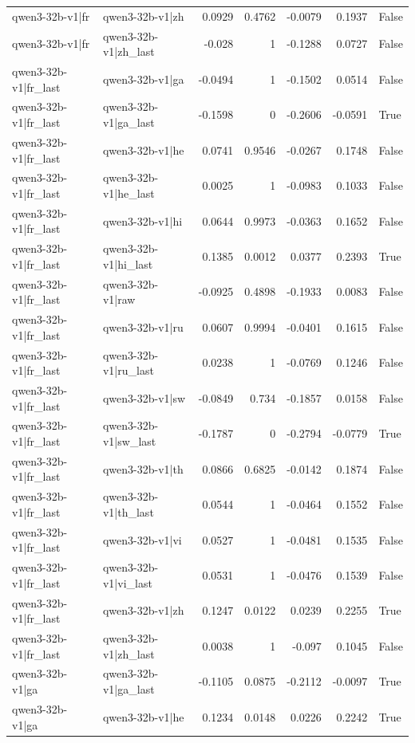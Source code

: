 \begin{table}
\begin{tabular}{l l r r r r l}
qwen3-32b-v1|fr & qwen3-32b-v1|zh & 0.0929 & 0.4762 & -0.0079 & 0.1937 & False \\
qwen3-32b-v1|fr & qwen3-32b-v1|zh_last & -0.028 & 1 & -0.1288 & 0.0727 & False \\
qwen3-32b-v1|fr_last & qwen3-32b-v1|ga & -0.0494 & 1 & -0.1502 & 0.0514 & False \\
qwen3-32b-v1|fr_last & qwen3-32b-v1|ga_last & -0.1598 & 0 & -0.2606 & -0.0591 & True \\
qwen3-32b-v1|fr_last & qwen3-32b-v1|he & 0.0741 & 0.9546 & -0.0267 & 0.1748 & False \\
qwen3-32b-v1|fr_last & qwen3-32b-v1|he_last & 0.0025 & 1 & -0.0983 & 0.1033 & False \\
qwen3-32b-v1|fr_last & qwen3-32b-v1|hi & 0.0644 & 0.9973 & -0.0363 & 0.1652 & False \\
qwen3-32b-v1|fr_last & qwen3-32b-v1|hi_last & 0.1385 & 0.0012 & 0.0377 & 0.2393 & True \\
qwen3-32b-v1|fr_last & qwen3-32b-v1|raw & -0.0925 & 0.4898 & -0.1933 & 0.0083 & False \\
qwen3-32b-v1|fr_last & qwen3-32b-v1|ru & 0.0607 & 0.9994 & -0.0401 & 0.1615 & False \\
qwen3-32b-v1|fr_last & qwen3-32b-v1|ru_last & 0.0238 & 1 & -0.0769 & 0.1246 & False \\
qwen3-32b-v1|fr_last & qwen3-32b-v1|sw & -0.0849 & 0.734 & -0.1857 & 0.0158 & False \\
qwen3-32b-v1|fr_last & qwen3-32b-v1|sw_last & -0.1787 & 0 & -0.2794 & -0.0779 & True \\
qwen3-32b-v1|fr_last & qwen3-32b-v1|th & 0.0866 & 0.6825 & -0.0142 & 0.1874 & False \\
qwen3-32b-v1|fr_last & qwen3-32b-v1|th_last & 0.0544 & 1 & -0.0464 & 0.1552 & False \\
qwen3-32b-v1|fr_last & qwen3-32b-v1|vi & 0.0527 & 1 & -0.0481 & 0.1535 & False \\
qwen3-32b-v1|fr_last & qwen3-32b-v1|vi_last & 0.0531 & 1 & -0.0476 & 0.1539 & False \\
qwen3-32b-v1|fr_last & qwen3-32b-v1|zh & 0.1247 & 0.0122 & 0.0239 & 0.2255 & True \\
qwen3-32b-v1|fr_last & qwen3-32b-v1|zh_last & 0.0038 & 1 & -0.097 & 0.1045 & False \\
qwen3-32b-v1|ga & qwen3-32b-v1|ga_last & -0.1105 & 0.0875 & -0.2112 & -0.0097 & True \\
qwen3-32b-v1|ga & qwen3-32b-v1|he & 0.1234 & 0.0148 & 0.0226 & 0.2242 & True \\

\end{tabular}
\end{table}
